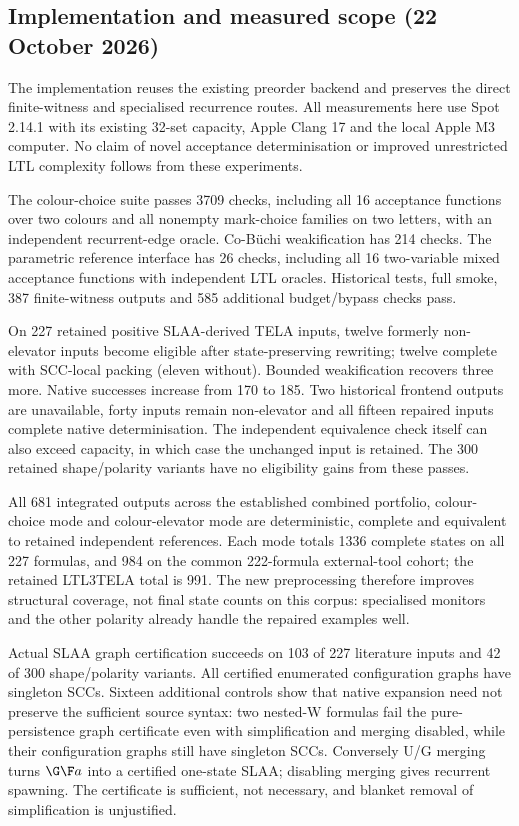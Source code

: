 \subsection{Implementation and measured scope (22 October 2026)}
The implementation reuses the existing preorder backend and preserves the
direct finite-witness and specialised recurrence routes. All measurements
here use Spot 2.14.1 with its existing 32-set capacity, Apple Clang 17 and
the local Apple M3 computer. No claim of novel acceptance determinisation
or improved unrestricted LTL complexity follows from these experiments.

The colour-choice suite passes 3709 checks, including all 16 acceptance
functions over two colours and all nonempty mark-choice families on two
letters, with an independent recurrent-edge oracle. Co-B\"uchi
weakification has 214 checks. The parametric reference interface has 26
checks, including all 16 two-variable mixed acceptance functions with
independent LTL oracles. Historical tests, full smoke, 387 finite-witness
outputs and 585 additional budget/bypass checks pass.

On 227 retained positive SLAA-derived TELA inputs, twelve formerly
non-elevator inputs become eligible after state-preserving rewriting;
twelve complete with SCC-local packing (eleven without). Bounded weakification recovers
three more. Native successes increase from 170 to 185. Two historical
frontend outputs are unavailable, forty inputs remain non-elevator and
all fifteen repaired inputs complete native determinisation. The independent
equivalence check itself can also exceed capacity, in which case the
unchanged input is retained. The 300 retained shape/polarity variants
have no eligibility gains from these passes.

All 681 integrated outputs across the established combined portfolio,
colour-choice mode and colour-elevator mode are deterministic, complete
and equivalent to retained independent references. Each mode totals
1336 complete states on all 227 formulas, and 984 on the common
222-formula external-tool cohort; the retained LTL3TELA total is 991.
The new preprocessing therefore improves structural coverage, not final
state counts on this corpus: specialised monitors and the other polarity
already handle the repaired examples well.

Actual SLAA graph certification succeeds on 103 of 227 literature inputs
and 42 of 300 shape/polarity variants. All certified enumerated
configuration graphs have singleton SCCs. Sixteen additional controls
show that native expansion need not preserve the sufficient source
syntax: two nested-W formulas fail the pure-persistence graph certificate
even with simplification and merging disabled, while their configuration
graphs still have singleton SCCs. Conversely U/G merging turns
$\G\F a$ into a certified one-state SLAA; disabling merging gives
recurrent spawning. The certificate is sufficient, not necessary, and
blanket removal of simplification is unjustified.

